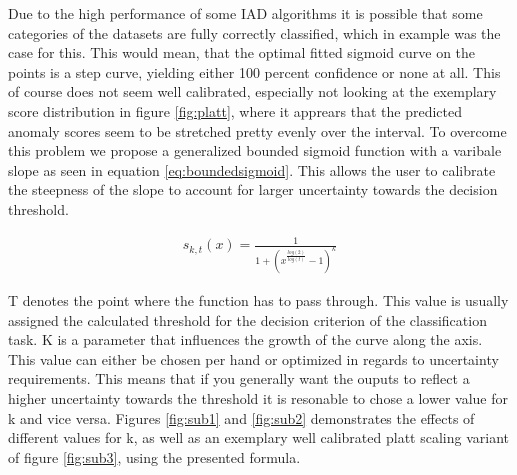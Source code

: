 Due to the high performance of some IAD algorithms it is possible that some categories 
of the datasets are fully correctly classified, which in example was the case for this. This would mean, that the optimal fitted sigmoid curve on the points 
is a step curve, yielding either 100 percent confidence or none at all. This of course does not seem well calibrated, especially not looking at the exemplary score distribution in figure \ref{fig:platt}, where it 
apprears that the predicted anomaly scores seem to be stretched pretty evenly over the interval. To overcome this problem 
we propose a generalized bounded sigmoid function with a varibale slope \cite{bounded_sigmoid} as seen in equation \ref{eq:boundedsigmoid}. This allows the user to calibrate the steepness of the slope to account for larger uncertainty 
towards the decision threshold.

\begin{equation}
    \label{eq:boundedsigmoid}
    \begin{split}
        s_{k, t}(x) = \frac{1}{1 + (x^{\frac{log(2)}{log(t)}} - 1)^{k}}
    \end{split}
\end{equation}

T denotes the point where the function has to pass through. This value is usually assigned the calculated threshold for the decision criterion of the classification task. K is a parameter 
that influences the growth of the curve along the axis. This value can either be chosen per hand or optimized in regards to uncertainty requirements. This means that if you generally want the 
ouputs to reflect a higher uncertainty towards the threshold it is resonable to chose a lower value for k and vice versa. Figures \ref{fig:sub1} and \ref{fig:sub2} demonstrates the effects of different values for k, as well 
as an exemplary well calibrated platt scaling variant of figure \ref{fig:sub3}, using the presented formula.

